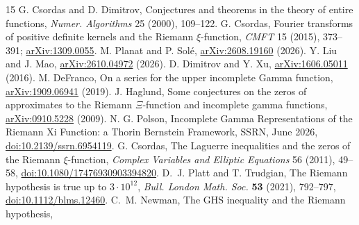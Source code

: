 \documentclass[11pt]{article}
\begin{document}








\let\section\MainSection
\appendix


\begin{thebibliography}{15}
 G. Csordas and D. Dimitrov,
Conjectures and theorems in the theory of entire functions,
\emph{Numer. Algorithms} 25 (2000), 109--122.
 G. Csordas, Fourier transforms of positive definite kernels
and the Riemann $\xi$-function, \emph{CMFT} 15 (2015), 373--391;
\href{https://arxiv.org/abs/1309.0055}{arXiv:1309.0055}.
 M. Planat and P. Sol\'e,
\href{https://arxiv.org/abs/2608.19160}{arXiv:2608.19160} (2026).
 Y. Liu and J. Mao,
\href{https://arxiv.org/abs/2610.04972}{arXiv:2610.04972} (2026).
 D. Dimitrov and Y. Xu,
\href{https://arxiv.org/abs/1606.05011}{arXiv:1606.05011} (2016).
 M. DeFranco, On a series for the upper incomplete
Gamma function, \href{https://arxiv.org/abs/1909.06941}{arXiv:1909.06941} (2019).
 J. Haglund, Some conjectures on the zeros of
approximates to the Riemann $\Xi$-function and incomplete gamma
functions, \href{https://arxiv.org/abs/0910.5228}{arXiv:0910.5228} (2009).
 N. G. Polson,
Incomplete Gamma Representations of the Riemann Xi Function:
a Thorin Bernstein Framework, SSRN, June 2026,
\href{https://doi.org/10.2139/ssrn.6954119}{doi:10.2139/ssrn.6954119}.
 G. Csordas,
The Laguerre inequalities and the zeros of the Riemann $\xi$-function,
\emph{Complex Variables and Elliptic Equations}
56 (2011), 49--58,
\href{https://doi.org/10.1080/17476930903394820}{doi:10.1080/17476930903394820}.
D.~J. Platt and T. Trudgian,
The Riemann hypothesis is true up to $3\cdot10^{12}$,
\emph{Bull. London Math. Soc.} \textbf{53} (2021),
792--797,
\href{https://doi.org/10.1112/blms.12460}{doi:10.1112/blms.12460}.
C.~M. Newman,
The GHS inequality and the Riemann hypothesis,

\end{thebibliography}
\end{document}
